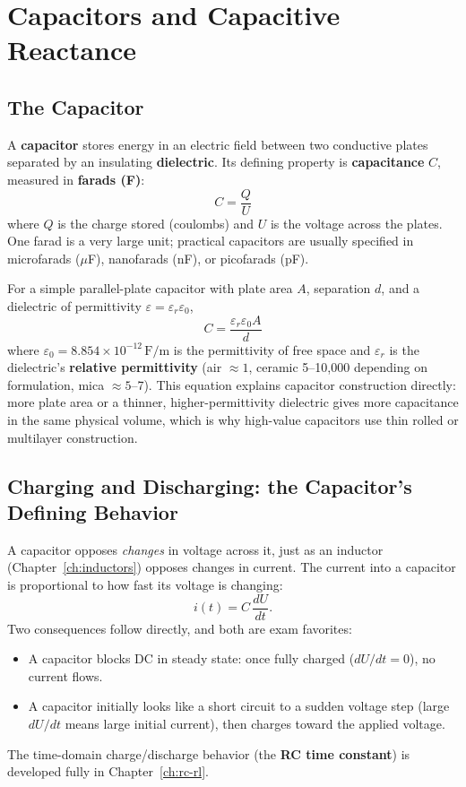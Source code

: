 \chapter{Capacitors and Capacitive Reactance}
\label{ch:capacitors}

\section{The Capacitor}

A \textbf{capacitor} stores energy in an electric field between two
conductive plates separated by an insulating \textbf{dielectric}. Its
defining property is \textbf{capacitance} $C$, measured in
\textbf{farads (F)}:
\[
\boxed{C = \frac{Q}{U}}
\]
where $Q$ is the charge stored (coulombs) and $U$ is the voltage across
the plates. One farad is a very large unit; practical capacitors are
usually specified in microfarads ($\mu$F), nanofarads (nF), or
picofarads (pF).

For a simple parallel-plate capacitor with plate area $A$, separation
$d$, and a dielectric of permittivity $\varepsilon = \varepsilon_r
\varepsilon_0$,
\[
C = \frac{\varepsilon_r \varepsilon_0 A}{d}
\]
where $\varepsilon_0 = 8.854\times10^{-12}\,\text{F/m}$ is the
permittivity of free space and $\varepsilon_r$ is the dielectric's
\textbf{relative permittivity} (air $\approx 1$, ceramic 5--10{,}000
depending on formulation, mica $\approx 5$--7). This equation explains
capacitor construction directly: more plate area or a thinner, higher-permittivity
dielectric gives more capacitance in the same physical volume, which is
why high-value capacitors use thin rolled or multilayer construction.

\section{Charging and Discharging: the Capacitor's Defining Behavior}

A capacitor opposes \emph{changes} in voltage across it, just as an
inductor (Chapter~\ref{ch:inductors}) opposes changes in current. The
current into a capacitor is proportional to how fast its voltage is
changing:
\[
i(t) = C\,\frac{dU}{dt}.
\]
Two consequences follow directly, and both are exam favorites:
\begin{itemize}
\item A capacitor blocks DC in steady state: once fully charged
($dU/dt = 0$), no current flows.
\item A capacitor initially looks like a short circuit to a sudden
voltage step (large $dU/dt$ means large initial current), then charges
toward the applied voltage.
\end{itemize}
The time-domain charge/discharge behavior (the \textbf{RC time
constant}) is developed fully in Chapter~\ref{ch:rc-rl}.

